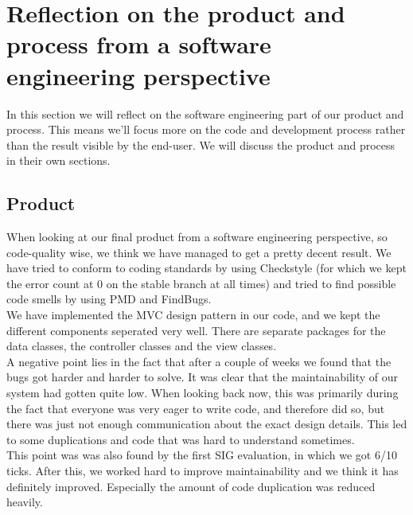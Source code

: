 \section{Reflection on the product and process from a software engineering perspective}

In this section we will reflect on the software engineering part of our product and process. This means we'll focus more on the code and development process rather than the result visible by the end-user. We will discuss the product and process in their own sections.

\subsection{Product}
When looking at our final product from a software engineering perspective, so code-quality wise, we think we have managed to get a pretty decent result. We have tried to conform to coding standards by using Checkstyle (for which we kept the error count at 0 on the stable branch at all times) and tried to find possible code smells by using PMD and FindBugs.\\
We have implemented the MVC design pattern in our code, and we kept the different components seperated very well. There are separate packages for the data classes, the controller classes and the view classes.\\
A negative point lies in the fact that after a couple of weeks we found that the bugs got harder and harder to solve. It was clear that the maintainability of our system had gotten quite low. When looking back now, this was primarily during the fact that everyone was very eager to write code, and therefore did so, but there was just not enough communication about the exact design details. This led to some duplications and code that was hard to understand sometimes.\\
This point was was also found by the first SIG evaluation, in which we got 6/10 ticks. After this, we worked hard to improve maintainability and we think it has definitely improved. Especially the amount of code duplication was reduced heavily.\\




